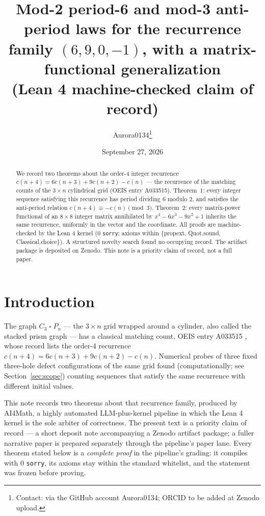 \documentclass[11pt]{article}
\title{Mod-2 period-6 and mod-3 anti-period laws for the recurrence family
$(6,9,0,-1)$, with a matrix-functional generalization\\
(Lean 4 machine-checked claim of record)}
\author{Aurora0134\thanks{Contact: via the GitHub account Aurora0134; ORCID to
be added at Zenodo upload.}}
\date{September 27, 2026}
\begin{document}
\maketitle

\begin{abstract}
We record two theorems about the order-4 integer recurrence $c(n+4) =
6c(n+3) + 9c(n+2) - c(n)$ --- the recurrence of the matching counts of the
$3 \times n$ cylindrical grid (OEIS entry A033515). Theorem~1: every
integer sequence satisfying this recurrence has period dividing $6$ modulo
$2$, and satisfies the anti-period relation $c(n+4) \equiv -c(n) \pmod 3$.
Theorem~2: every matrix-power functional of an $8 \times 8$ integer matrix
annihilated by $x^4 - 6x^3 - 9x^2 + 1$ inherits the same recurrence,
uniformly in the vector and the coordinate. All proofs are machine-checked
by the Lean 4 kernel (0 \texttt{sorry}; axioms within \{propext, Quot.sound,
Classical.choice\}). A structured novelty search found no occupying record.
The artifact package is deposited on Zenodo. This note is a priority claim
of record, not a full paper.
\end{abstract}

\section{Introduction}

The graph $C_3 \mathbin{\square} P_n$ --- the $3 \times n$ grid wrapped
around a cylinder, also called the stacked prism graph --- has a classical
matching count, OEIS entry A033515 \cite{oeis-a033515}, whose record lists
the order-4 recurrence $c(n+4) = 6c(n+3) + 9c(n+2) - c(n)$. Numerical
probes of three fixed three-hole defect configurations of the same grid
found (computationally; see Section~\ref{sec:scope}) counting sequences
that satisfy the same recurrence with different initial values.

This note records two theorems about that recurrence family, produced by
AI4Math, a highly automated LLM-plus-kernel pipeline in which the Lean 4
kernel is the sole arbiter of correctness. The present text is a priority
claim of record --- a short deposit note accompanying a Zenodo artifact
package; a fuller narrative paper is prepared separately through the
pipeline's paper lane. Every theorem stated below is a \emph{complete
proof} in the pipeline's grading: it compiles with 0 \texttt{sorry}, its
axioms stay within the standard whitelist, and the statement was frozen
before proving.
\end{document}
